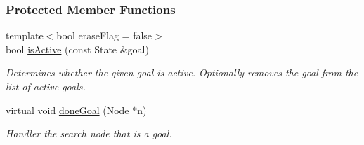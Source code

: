 \subsubsection*{Protected Member Functions}
\begin{DoxyCompactItemize}
\item 
{\footnotesize template$<$bool erase\+Flag = false$>$ }\\bool \hyperlink{structgoalHandler_1_1MultipleGoal_a5676e764bb6bfe5784031132fc2e1979}{is\+Active} (const State \&goal)
\begin{DoxyCompactList}\small\item\em Determines whether the given goal is active. Optionally removes the goal from the list of active goals. \end{DoxyCompactList}\item 
virtual void \hyperlink{structgoalHandler_1_1MultipleGoal_a38ead64f47918e7e099930ee2eb7b211}{done\+Goal} (Node $\ast$n)
\begin{DoxyCompactList}\small\item\em Handler the search node that is a goal. \end{DoxyCompactList}\end{DoxyCompactItemize}

